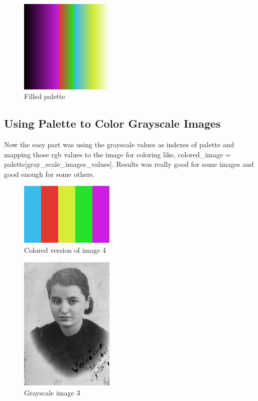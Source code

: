 \documentclass[conference]{IEEEtran}
\begin{document}
\begin{figure}[H]
    \centering
    \includegraphics[width=0.4\textwidth]{resources/4_filled_palette.png}
    \caption{Filled palette}
    \label{fig:image_4_filled_palette}
\end{figure}

\subsection{Using Palette to Color Grayscale Images}
Now the easy part was using the grayscale values as indexes of palette and mapping those rgb values to the image for coloring like, colored\_image = palette[gray\_scale\_images\_values]. Results was really good for some images and good enough for some others.

\begin{figure}[H]
    \centering
    \includegraphics[width=0.4\textwidth]{resources/4_colored.png}
    \caption{Colored version of image 4}
    \label{fig:image_4_colored}
\end{figure}

\begin{figure}[H]
    \centering
    \includegraphics[width=0.4\textwidth]{resources/3.jpg}
    \caption{Grayscale image 3}
    \label{fig:image_4_colored}
\end{figure}
\end{document}
